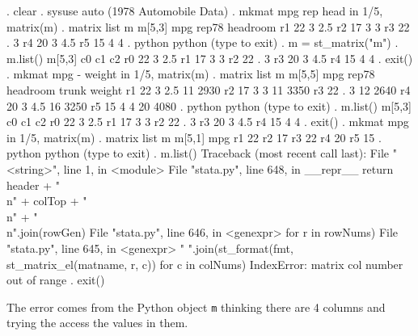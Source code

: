 \documentclass{article}
\begin{document}
\begin{stlog}
. clear
{\smallskip}
. sysuse auto
(1978 Automobile Data)
{\smallskip}
. mkmat mpg rep head in 1/5, matrix(m)
{\smallskip}
. matrix list m
{\smallskip}
m[5,3]
         mpg     rep78  headroom
r1        22         3       2.5
r2        17         3         3
r3        22         .         3
r4        20         3       4.5
r5        15         4         4
{\smallskip}
. python
 python (type {} to exit) 
{\bftt{>>>}}. m = st_matrix("m")
{\smallskip}
{\bftt{>>>}}. m.list()
{\smallskip}
m[5,3]
           c0         c1         c2
r0         22          3        2.5
r1         17          3          3
r2         22          .          3
r3         20          3        4.5
r4         15          4          4
{\smallskip}
{\bftt{>>>}}. exit()
{\smallskip}
. mkmat mpg - weight in 1/5, matrix(m)
{\smallskip}
. matrix list m
{\smallskip}
m[5,5]
         mpg     rep78  headroom     trunk    weight
r1        22         3       2.5        11      2930
r2        17         3         3        11      3350
r3        22         .         3        12      2640
r4        20         3       4.5        16      3250
r5        15         4         4        20      4080
{\smallskip}
. python
 python (type {} to exit) 
{\bftt{>>>}}. m.list()
{\smallskip}
m[5,3]
           c0         c1         c2
r0         22          3        2.5
r1         17          3          3
r2         22          .          3
r3         20          3        4.5
r4         15          4          4
{\smallskip}
{\bftt{>>>}}. exit()
{\smallskip}
. mkmat mpg in 1/5, matrix(m)
{\smallskip}
. matrix list m
{\smallskip}
m[5,1]
    mpg
r1   22
r2   17
r3   22
r4   20
r5   15
{\smallskip}
. python
 python (type {} to exit) 
{\bftt{>>>}}. m.list()
{\color{red}Traceback (most recent call last):
  File "<string>", line 1, in <module>
  File "stata.py", line 648, in __repr__
    return header + "\\n" + colTop + "\\n" + "\\n".join(rowGen)
  File "stata.py", line 646, in <genexpr>
    for r in rowNums)
  File "stata.py", line 645, in <genexpr>
    " ".join(st_format(fmt, st_matrix_el(matname, r, c)) for c in colNums)
IndexError: matrix col number out of range}
{\smallskip}
{\bftt{>>>}}. exit()
\end{stlog}

\medskip

The error comes from the Python object \texttt{m} thinking there are 4 columns and trying the access the values in them.
\end{document}
